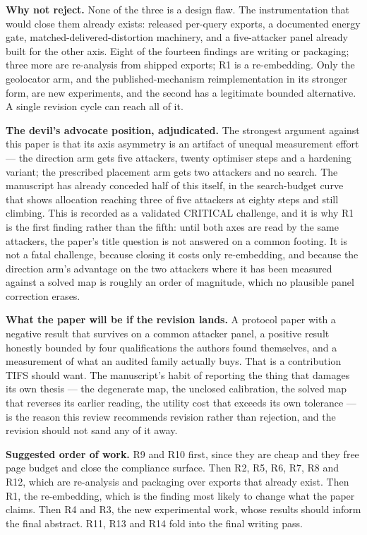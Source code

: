 \documentclass[11pt,a4paper]{article}
\begin{document}
\textbf{Why not reject.} None of the three is a design flaw. The instrumentation
that would close them already exists: released per-query exports, a documented
energy gate, matched-delivered-distortion machinery, and a five-attacker panel
already built for the other axis. Eight of the fourteen findings are writing or
packaging; three more are re-analysis from shipped exports; R1 is a
re-embedding. Only the geolocator arm, and the published-mechanism
reimplementation in its stronger form, are new experiments, and the second has
a legitimate bounded alternative. A single revision cycle can reach all of it.

\textbf{The devil's advocate position, adjudicated.} The strongest argument
against this paper is that its axis asymmetry is an artifact of unequal
measurement effort --- the direction arm gets five attackers, twenty optimiser
steps and a hardening variant; the prescribed placement arm gets two attackers
and no search. The manuscript has already conceded half of this itself, in the
search-budget curve that shows allocation reaching three of five attackers at
eighty steps and still climbing. This is recorded as a validated CRITICAL
challenge, and it is why R1 is the first finding rather than the fifth: until
both axes are read by the same attackers, the paper's title question is not
answered on a common footing. It is not a fatal challenge, because closing it
costs only re-embedding, and because the direction arm's advantage on the two
attackers where it has been measured against a solved map is roughly an order
of magnitude, which no plausible panel correction erases.

\textbf{What the paper will be if the revision lands.} A protocol paper with a
negative result that survives on a common attacker panel, a positive result
honestly bounded by four qualifications the authors found themselves, and a
measurement of what an audited family actually buys. That is a contribution
TIFS should want. The manuscript's habit of reporting the thing that damages
its own thesis --- the degenerate map, the unclosed calibration, the solved map
that reverses its earlier reading, the utility cost that exceeds its own
tolerance --- is the reason this review recommends revision rather than
rejection, and the revision should not sand any of it away.

\textbf{Suggested order of work.} R9 and R10 first, since they are cheap and
they free page budget and close the compliance surface. Then R2, R5, R6, R7,
R8 and R12, which are re-analysis and packaging over exports that already
exist. Then R1, the re-embedding, which is the finding most likely to change
what the paper claims. Then R4 and R3, the new experimental work, whose results
should inform the final abstract. R11, R13 and R14 fold into the final writing
pass.
\end{document}
